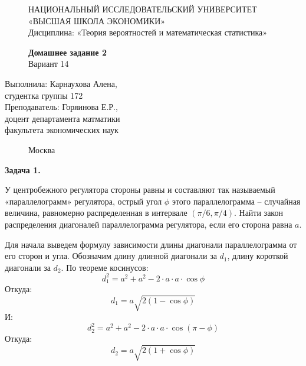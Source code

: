 \documentclass[]{article}
\begin{document}
	\begin{figure}[t]
		\centering
		\large
		НАЦИОНАЛЬНЫЙ ИССЛЕДОВАТЕЛЬСКИЙ УНИВЕРСИТЕТ\\
		«ВЫСШАЯ ШКОЛА ЭКОНОМИКИ»\\
		Дисциплина: «Теория вероятностей и математическая статистика»
	\end{figure}
	
	\begin{figure}[h]
	\vspace{3in}
	\centering
	\Huge
	\textbf{Домашнее задание 2}\\
	Вариант 14 
	\end{figure}
	
	\vspace{2in}
	\Large
	\raggedleft
	Выполнила: Карнаухова Алена,\\
	студентка группы 172\\
	\vspace{12pt}
	Преподаватель: Горяинова Е.Р.,\\
	доцент департамента матматики\\
	факультета экономических наук
	
	\begin{figure}[b]
		\centering
		Москва \the\year
	\end{figure}
	
	\thispagestyle{empty}
	
	\newpage
	
	\centering
	\large
	\textbf{Задача 1.}
	
	\vspace{10pt}
	
	\raggedright

	У центробежного регулятора стороны равны и составляют так называемый
	«параллелограмм» регулятора, острый угол $\phi$ этого параллелограмма -- случайная величина,
	равномерно распределенная в интервале $(\pi/6, \pi/4)$. Найти закон распределения диагоналей
	параллелограмма регулятора, если его сторона равна $a$.

	\vspace{20pt}
	
	Для начала выведем формулу зависимости длины диагонали параллелограмма от его сторон и угла. Обозначим 		длину длинной диагонали за $d_1$, длину короткой диагонали за $d_2$.
	По теореме косинусов:
	\begin{equation}
	d_1^2 = a^2 + a^2 - 2 \cdot a \cdot a \cdot \cos \phi
	\end{equation}
	Откуда:
	\begin{equation}
	d_1 = a\sqrt{2(1-\cos\phi)}
	\end{equation}
	И:
	\begin{equation}
	d_2^2 = a^2 + a^2 - 2 \cdot a \cdot a \cdot \cos (\pi - \phi)
	\end{equation}
	Откуда:
	\begin{equation}
	d_2 = a\sqrt{2(1+\cos\phi)}
	\end{equation}
	
\end{document}

